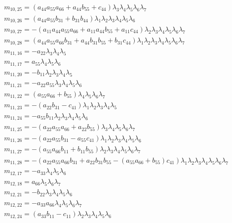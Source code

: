 \documentclass{article}
\begin{document}
\begin{align*}
&m_{10,25}={\left(a_{44} a_{55} a_{66} + a_{44} b_{55} + c_{44}\right)} \lambda_{3} \lambda_{4} \lambda_{5} \lambda_{6} \lambda_{7}\\
&m_{10,26}={\left(a_{44} a_{55} b_{31} + b_{31} b_{44}\right)} \lambda_{1} \lambda_{2} \lambda_{3} \lambda_{4} \lambda_{5} \lambda_{6}\\
&m_{10,27}=-{\left(a_{11} a_{44} a_{55} a_{66} + a_{11} a_{44} b_{55} + a_{11} c_{44}\right)} \lambda_{2} \lambda_{3} \lambda_{4} \lambda_{5} \lambda_{6} \lambda_{7}\\
&m_{10,28}={\left(a_{44} a_{55} a_{66} b_{31} + a_{44} b_{31} b_{55} + b_{31} c_{44}\right)} \lambda_{1} \lambda_{2} \lambda_{3} \lambda_{4} \lambda_{5} \lambda_{6} \lambda_{7}\\
&m_{11,16}=-a_{22} \lambda_{3} \lambda_{4} \lambda_{5}\\
&m_{11,17}=a_{55} \lambda_{4} \lambda_{5} \lambda_{6}\\
&m_{11,20}=-b_{11} \lambda_{2} \lambda_{3} \lambda_{4} \lambda_{5}\\
&m_{11,21}=-a_{22} a_{55} \lambda_{3} \lambda_{4} \lambda_{5} \lambda_{6}\\
&m_{11,22}={\left(a_{55} a_{66} + b_{55}\right)} \lambda_{4} \lambda_{5} \lambda_{6} \lambda_{7}\\
&m_{11,23}=-{\left(a_{22} b_{31} - c_{41}\right)} \lambda_{1} \lambda_{2} \lambda_{3} \lambda_{4} \lambda_{5}\\
&m_{11,24}=-a_{55} b_{11} \lambda_{2} \lambda_{3} \lambda_{4} \lambda_{5} \lambda_{6}\\
&m_{11,25}=-{\left(a_{22} a_{55} a_{66} + a_{22} b_{55}\right)} \lambda_{3} \lambda_{4} \lambda_{5} \lambda_{6} \lambda_{7}\\
&m_{11,26}=-{\left(a_{22} a_{55} b_{31} - a_{55} c_{41}\right)} \lambda_{1} \lambda_{2} \lambda_{3} \lambda_{4} \lambda_{5} \lambda_{6}\\
&m_{11,27}=-{\left(a_{55} a_{66} b_{11} + b_{11} b_{55}\right)} \lambda_{2} \lambda_{3} \lambda_{4} \lambda_{5} \lambda_{6} \lambda_{7}\\
&m_{11,28}=-{\left(a_{22} a_{55} a_{66} b_{31} + a_{22} b_{31} b_{55} - {\left(a_{55} a_{66} + b_{55}\right)} c_{41}\right)} \lambda_{1} \lambda_{2} \lambda_{3} \lambda_{4} \lambda_{5} \lambda_{6} \lambda_{7}\\
&m_{12,17}=-a_{33} \lambda_{4} \lambda_{5} \lambda_{6}\\
&m_{12,18}=a_{66} \lambda_{5} \lambda_{6} \lambda_{7}\\
&m_{12,21}=-b_{22} \lambda_{3} \lambda_{4} \lambda_{5} \lambda_{6}\\
&m_{12,22}=-a_{33} a_{66} \lambda_{4} \lambda_{5} \lambda_{6} \lambda_{7}\\
&m_{12,24}={\left(a_{33} b_{11} - c_{11}\right)} \lambda_{2} \lambda_{3} \lambda_{4} \lambda_{5} \lambda_{6}\\
\end{align*}
\end{document}
